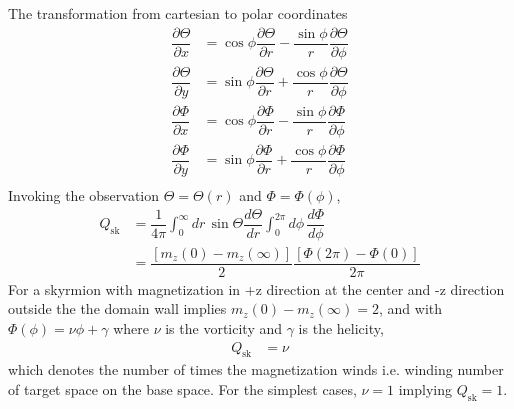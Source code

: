 \documentclass[aps,prb,onecolumn,notitlepage,showpacs,floatfix,superscriptaddress]{revtex4-1}
\newcommand{\mrm}[1]{\mathrm{#1}}
\begin{document}
The transformation from cartesian to polar coordinates
\begin{equation}
\begin{split}
\dfrac{\partial \Theta}{\partial x} &= \cos\phi \dfrac{\partial \Theta}{\partial r} -\dfrac{\sin\phi}{r} \dfrac{\partial \Theta}{\partial \phi} \\
\dfrac{\partial \Theta}{\partial y} &= \sin\phi \dfrac{\partial \Theta}{\partial r} +\dfrac{\cos\phi}{r} \dfrac{\partial \Theta}{\partial \phi} \\
\dfrac{\partial \Phi}{\partial x} &=  \cos\phi \dfrac{\partial \Phi}{\partial r} -\dfrac{\sin\phi}{r} \dfrac{\partial \Phi}{\partial \phi}\\
\dfrac{\partial \Phi}{\partial y} &= \sin\phi \dfrac{\partial \Phi}{\partial r} +\dfrac{\cos\phi}{r} \dfrac{\partial \Phi}{\partial \phi} \\
\end{split}
\end{equation}
Invoking the observation $\Theta = \Theta(r)$ and $\Phi = \Phi(\phi)$,
\begin{equation}
\begin{split}
Q_\mrm{sk} &=\dfrac{1}{4\pi}\int_0^\infty dr \, \sin\Theta \dfrac{d\Theta}{dr} \int_0^{2\pi} d\phi\,  \dfrac{d\Phi}{d\phi} \\
&= \dfrac{[m_z(0)-m_z(\infty)]}{2} \dfrac{[\Phi(2\pi)-\Phi(0)]}{2\pi} 
\end{split}
\end{equation}
For a skyrmion with magnetization in +z direction at the center and -z direction outside the the domain wall implies $m_z(0)-m_z(\infty) = 2$, and with $\Phi(\phi) = \nu \phi + \gamma$ where $\nu$ is the vorticity and $\gamma$ is the helicity,
\begin{equation}
\begin{split}
Q_\mrm{sk} &= \nu
\end{split}
\end{equation}
which denotes the number of times the magnetization winds i.e. winding number of target space on the base space. For the simplest cases, $\nu=1$ implying $Q_\mrm{sk}=1$.
%
\end{document}
